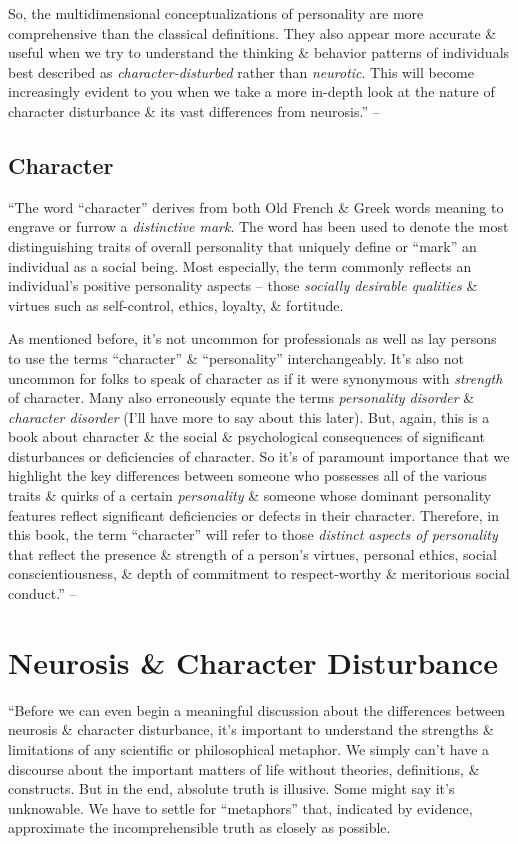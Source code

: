 \documentclass{article}
\numberwithin{equation}{section}
\begin{document}
So, the multidimensional conceptualizations of personality are more comprehensive than the classical definitions. They also appear more accurate \& useful when we try to understand the thinking \& behavior patterns of individuals best described as \textit{character-disturbed} rather than \textit{neurotic}. This will become increasingly evident to you when we take a more in-depth look at the nature of character disturbance \& its vast differences from neurosis.'' -- \cite[pp. 21--23]{Simon2011}

\subsection*{Character}
``The word ``character'' derives from both Old French \& Greek words meaning to engrave or furrow a \textit{distinctive mark}. The word has been used to denote the most distinguishing traits of overall personality that uniquely define or ``mark'' an individual as a social being. Most especially, the term commonly reflects an individual's positive personality aspects -- those \textit{socially desirable qualities} \& virtues such as self-control, ethics, loyalty, \& fortitude.

As mentioned before, it's not uncommon for professionals as well as lay persons to use the terms ``character'' \& ``personality'' interchangeably. It's also not uncommon for folks to speak of character as if it were synonymous with \textit{strength} of character. Many also erroneously equate the terms \textit{personality disorder} \& \textit{character disorder} (I'll have more to say about this later). But, again, this is a book about character \& the social \& psychological consequences of significant disturbances or deficiencies of character. So it's of paramount importance that we highlight the key differences between someone who possesses all of the various traits \& quirks of a certain \textit{personality} \& someone whose dominant personality features reflect significant deficiencies or defects in their character. Therefore, in this book, the term ``character'' will refer to those \textit{distinct aspects of personality} that reflect the presence \& strength of a person's virtues, personal ethics, social conscientiousness, \& depth of commitment to respect-worthy \& meritorious social conduct.'' -- \cite[p. 23]{Simon2011}


\section{Neurosis \& Character Disturbance}
``Before we can even begin a meaningful discussion about the differences between neurosis \& character disturbance, it's important to understand the strengths \& limitations of any scientific or philosophical metaphor. We simply can't have a discourse about the important matters of life without theories, definitions, \& constructs. But in the end, absolute truth is illusive. Some might say it's unknowable. We have to settle for ``metaphors'' that, indicated by evidence, approximate the incomprehensible truth as closely as possible.
\end{document}
